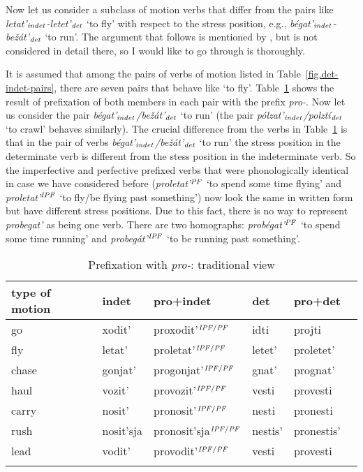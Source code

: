 Now let us consider a subclass of motion verbs that differ from the pairs like \textit{letat'$_{\mathit{indet}}$-letet'$_{\mathit{det}}$} `to fly' with respect to the stress position, e.g., \textit{b\'{e}gat'$_{\mathit{indet}}$-be\v{z}\'{a}t'$_{\mathit{det}}$} `to run'. The argument that follows is mentioned by \citet{Isachenko:60}, but is not considered in detail there, so I would like to go through is thoroughly. 

It is assumed that among the pairs of verbs of motion listed in
Table~\ref{fig.det-indet-pairs}, there are seven pairs that behave like
 `to fly'. Table~\ref{tab.seven-pairs} shows the result of prefixation of both members in each pair with the prefix \textit{pro-}. Now let us consider the pair \textit{b\'{e}gat'$_{\mathit{indet}}$/be\v{z}\'{a}t'$_{\mathit{det}}$} `to run' (the pair \textit{p\'{o}lzat'$_{\mathit{indet}}$/polzt\'{i}$_{\mathit{det}}$} `to crawl' behaves similarly). The crucial difference from the verbs in Table~\ref{tab.seven-pairs} is that in the pair of verbs \textit{b\'{e}gat'$_{\mathit{indet}}$/be\v{z}\'{a}t'$_{\mathit{det}}$} `to run' the stress position in the determinate verb is different from the stess position in the indeterminate verb. So the imperfective and perfective prefixed verbs that were phonologically identical in case we have considered before (\textit{proletat'}$^{\mathit{PF}}$ `to spend some time flying' and \textit{proletat'}$^{\mathit{IPF}}$ `to fly/be flying past something') now look the same in written form but have different stress positions. Due to this fact, there is no way to represent \textit{probegat'} as being one verb. There are two homographs: \textit{prob\'{e}gat'}$^{{\mathit{PF}}}$ `to spend some time running' and \textit{probeg\'{a}t'}$^{{\mathit{IPF}}}$ `to be running past something'.

\begin{table}
\begin{tabular}{llllll}
\lsptoprule
type of motion & indet & pro+indet & det & pro+det\\
\midrule
go & xodit' & proxodit'$^{{\mathit{IPF}}/{\mathit{PF}}}$ & idti & projti\\
fly & letat' & proletat'$^{{\mathit{IPF}}/{\mathit{PF}}}$ & letet' & proletet'\\
chase & gonjat' & progonjat'$^{{\mathit{IPF}}/{\mathit{PF}}}$ & gnat' & prognat'\\
haul & vozit' & provozit'$^{{\mathit{IPF}}/{\mathit{PF}}}$ & vesti & provesti\\
carry & nosit' & pronosit'$^{{\mathit{IPF}}/{\mathit{PF}}}$ & nesti & pronesti\\
rush & nosit'sja & pronosit'sja$^{{\mathit{IPF}}/{\mathit{PF}}}$ & nestis' & pronestis'\\
lead & vodit' & provodit'$^{{\mathit{IPF}}/{\mathit{PF}}}$ & vesti & provesti\\
\lspbottomrule
\end{tabular}
\caption{Prefixation with \textit{pro-}: traditional view\label{tab.seven-pairs}}
\end{table}

